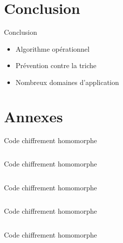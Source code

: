 \documentclass[10pt, compress]{beamer}
\begin{document}
\section{Conclusion}

  \begin{frame}{Conclusion}
    \begin{itemize}[<+- | alert@+>]
      \item Algorithme opérationnel
      \item Prévention contre la triche
      \item Nombreux domaines d'application
    \end{itemize}
  \end{frame}


\section{Annexes}

  \begin{frame}{Code chiffrement homomorphe}
    \inputminted[linenos, breaklines, autogobble, fontsize=\small, firstline=1, lastline=16]{python}{../elgamal.py}
  \end{frame}

  \begin{frame}{Code chiffrement homomorphe}
    \inputminted[linenos, breaklines, autogobble, fontsize=\small, firstline=17, lastline=31]{python}{../elgamal.py}
  \end{frame}

  \begin{frame}{Code chiffrement homomorphe}
    \inputminted[linenos, breaklines, autogobble, fontsize=\small, firstline=32, lastline=47]{python}{../elgamal.py}
  \end{frame}

  \begin{frame}{Code chiffrement homomorphe}
    \inputminted[linenos, breaklines, autogobble, fontsize=\small, firstline=48, lastline=63]{python}{../elgamal.py}
  \end{frame}

  \begin{frame}{Code chiffrement homomorphe}
    \inputminted[linenos, breaklines, autogobble, fontsize=\small, firstline=64, lastline=79]{python}{../elgamal.py}
  \end{frame}
\end{document}
